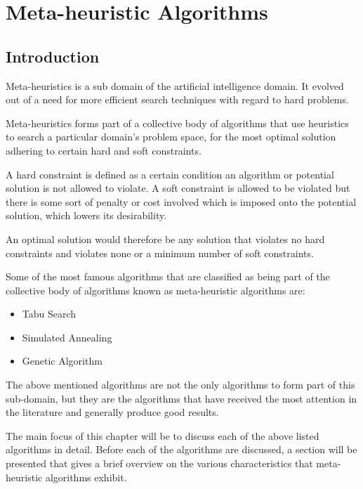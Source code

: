 \chapter{Meta-heuristic Algorithms}
\label{chpt:heuristic}
\section{Introduction}
Meta-heuristics is a sub domain of the artificial intelligence domain\cite{AIModernApproach}. It evolved out of a need for more efficient search techniques with regard to hard problems. 

Meta-heuristics forms part of a collective body of algorithms that use heuristics to search a particular domain's problem space, for the most optimal solution adhering to certain hard and soft constraints\cite{AIModernApproach,NatureInspiredMetaHeuristic}. 

A hard constraint is defined as a certain condition an algorithm or potential solution is not allowed to violate\cite{AIModernApproach,NatureInspiredMetaHeuristic,Karen2004,Eisenblatter}. A soft constraint is allowed to be violated but there is some sort of penalty or cost involved which is imposed onto the potential solution, which lowers its desirability\cite{AIModernApproach,NatureInspiredMetaHeuristic,Karen2004,Eisenblatter}. 

An optimal solution would therefore be any solution that violates no hard constraints and violates none or a minimum number of soft constraints\cite{AIModernApproach,NatureInspiredMetaHeuristic,Karen2004,Eisenblatter}.

Some of the most famous algorithms that are classified as being part of the collective body of algorithms known as meta-heuristic algorithms are:
\begin{itemize}
\item Tabu Search
\item Simulated Annealing
\item Genetic Algorithm
\end{itemize}
The above mentioned algorithms are not the only algorithms to form part of this sub-domain, but they are the algorithms that have received the most attention in the literature and generally produce good results\cite{SweepMeta}.

The main focus of this chapter will be to discuss each of the above listed algorithms in detail. Before each of the algorithms are discussed, a section will be presented that gives a brief overview on the various characteristics that meta-heuristic algorithms exhibit. 

